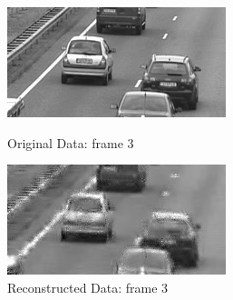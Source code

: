 \documentclass[12pt]{article}
\begin{document}
\begin{itemize}
\begin{enumerate}
    \begin{figure}[H]
        \centering
        \begin{minipage}{.45\textwidth}
            \centering
            \includegraphics[width=\linewidth]{results/cars_5_orig_3.png}
            \caption*{Original Data: frame 3}
        \end{minipage}
        \begin{minipage}{.45\textwidth}
            \centering
            \includegraphics[width=\linewidth]{results/cars_5_recon_3.png}
            \caption*{Reconstructed Data: frame 3}
        \end{minipage}
    \end{figure}
    

\end{enumerate}
\end{itemize}
\end{document}

